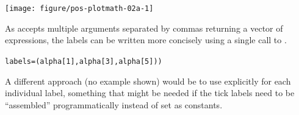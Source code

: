 \documentclass[krantz2]{krantz}\usepackage{knitr}%
\begin{document}
\begin{knitrout}\footnotesize
{}\color{fgcolor}\begin{kframe}
\begin{alltt}
 \hlkwb{<-} 
  \hlopt{+}
   \hlstd{()} \hlopt{+}
   \hlstd{(} \hlstd{=} \hlstd{(}  \hlopt{+}
   \hlstd{(} \hlstd{=} 
                       \hlstd{=} \hlstd{(}\hlstd{,}\hlstd{,}\hlstd{),}
                       \hlstd{=} \hlstd{(}\hlstd{(alpha[}\hlstd{]),}
                                 \hlstd{(alpha[}\hlstd{]),}
                                 \hlstd{(alpha[}\hlstd{])))}
\end{alltt}
\end{kframe}

{\centering \texttt{[image: figure/pos-plotmath-02a-1]} 

}



\end{knitrout}

As  accepts multiple arguments separated by commas returning a vector of expressions, the labels can be written more concisely using a single call to .

\begin{knitrout}\footnotesize
{}\color{fgcolor}\begin{kframe}
\begin{alltt}
                      labels = (alpha[1], alpha[3], alpha[5]))
\end{alltt}
\end{kframe}
\end{knitrout}

A different approach (no example shown) would be to use  explicitly for each individual label, something that might be needed if the tick labels need to be ``assembled'' programmatically instead of set as constants.
\end{document}
